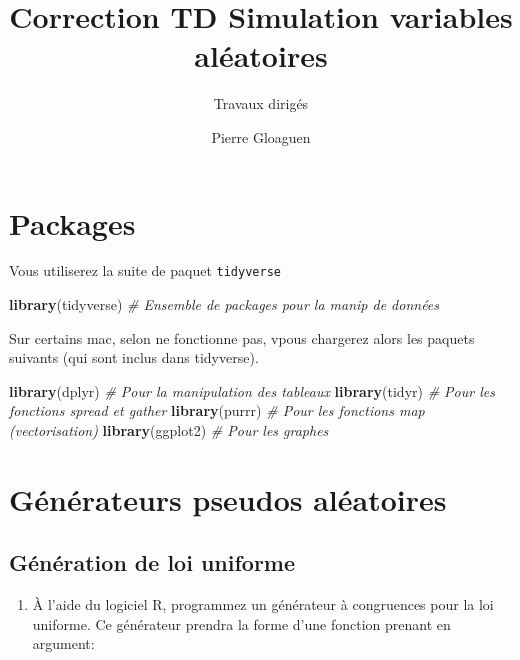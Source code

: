 \documentclass[]{article}
\title{Correction TD Simulation variables aléatoires}
\subtitle{Travaux dirigés}
\author{Pierre Gloaguen}
\date{}
\newenvironment{Shaded}{\begin{snugshade}}{\end{snugshade}}
\newcommand{\CommentTok}[1]{\textcolor[rgb]{0.56,0.35,0.01}{\textit{#1}}}
\newcommand{\KeywordTok}[1]{\textcolor[rgb]{0.13,0.29,0.53}{\textbf{#1}}}
\newcommand{\NormalTok}[1]{#1}
\providecommand{\tightlist}{%
  \setlength{\itemsep}{0pt}\setlength{\parskip}{0pt}}
\begin{document}
\maketitle

{
\setcounter{tocdepth}{3}
\tableofcontents
}
\hypertarget{packages}{%
\section*{Packages}\label{packages}}

Vous utiliserez la suite de paquet \texttt{tidyverse}

\begin{Shaded}
\begin{Highlighting}[]
\KeywordTok{library}\NormalTok{(tidyverse) }\CommentTok{# Ensemble de packages pour la manip de données}
\end{Highlighting}
\end{Shaded}

Sur certains mac, selon ne fonctionne pas, vpous chargerez alors les
paquets suivants (qui sont inclus dans tidyverse).

\begin{Shaded}
\begin{Highlighting}[]
\KeywordTok{library}\NormalTok{(dplyr) }\CommentTok{# Pour la manipulation des tableaux}
\KeywordTok{library}\NormalTok{(tidyr) }\CommentTok{# Pour les fonctions spread et gather}
\KeywordTok{library}\NormalTok{(purrr) }\CommentTok{# Pour les fonctions map (vectorisation)}
\KeywordTok{library}\NormalTok{(ggplot2) }\CommentTok{# Pour les graphes }
\end{Highlighting}
\end{Shaded}

\hypertarget{guxe9nuxe9rateurs-pseudos-aluxe9atoires}{%
\section{Générateurs pseudos
aléatoires}\label{guxe9nuxe9rateurs-pseudos-aluxe9atoires}}

\hypertarget{guxe9nuxe9ration-de-loi-uniforme}{%
\subsection{Génération de loi
uniforme}\label{guxe9nuxe9ration-de-loi-uniforme}}

\begin{enumerate}
\def\labelenumi{\arabic{enumi}.}
\tightlist
\item
  À l'aide du logiciel R, programmez un générateur à congruences pour la
  loi uniforme. Ce générateur prendra la forme d'une fonction prenant en
  argument:
\end{enumerate}
\end{document}
